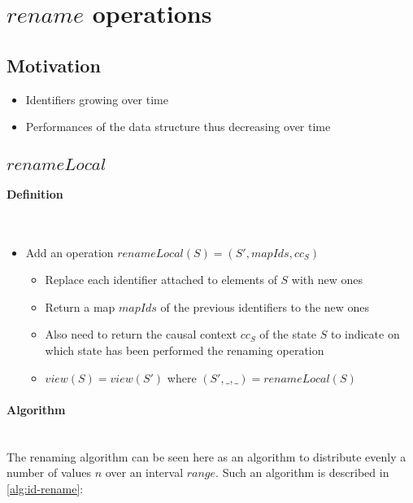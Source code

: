 \documentclass[a4paper]{article}
\begin{document}
\section{$rename$ operations}

\subsection{Motivation}

\begin{itemize}
  \item Identifiers growing over time
  \item Performances of the data structure thus decreasing over time
\end{itemize}

\subsection{$renameLocal$}

\paragraph{Definition}~\\

\begin{itemize}
  \item Add an operation $renameLocal(S) = (S', mapIds, cc_S)$
  \begin{itemize}
    \item Replace each identifier attached to elements of $S$ with new ones
    \item Return a map $mapIds$ of the previous identifiers to the new ones
    \item Also need to return the causal context $cc_S$ of the state $S$
      to indicate on which state has been performed the renaming operation
    \item $view(S) = view(S')$ where $(S', \_, \_) = renameLocal(S)$
  \end{itemize}
\end{itemize}

\paragraph{Algorithm}~\\

The renaming algorithm can be seen here as an algorithm
to distribute evenly a number of values $n$ over an interval $range$.
Such an algorithm is described in \ref{alg:id-rename}:
\end{document}
